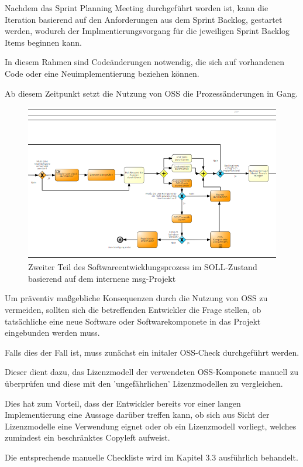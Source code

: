 Nachdem das Sprint Planning Meeting durchgeführt worden ist, kann die Iteration basierend auf den Anforderungen aus dem Sprint Backlog, gestartet werden, wodurch der Implmentierungsvorgang für die jeweiligen Sprint Backlog Items beginnen kann.

In diesem Rahmen sind Codeänderungen notwendig, die sich auf vorhandenen Code oder eine Neuimplementierung beziehen können.

Ab diesem Zeitpunkt setzt die Nutzung von OSS die Prozessänderungen in Gang.

\begin{figure}[h]
    \centering
    \includegraphics[scale=0.5]{Bilder/SOLL-Prozess_second Part.png}
    \caption{Zweiter Teil des Softwareentwicklungsprozess im SOLL-Zustand basierend auf dem internene msg-Projekt}
\end{figure}

Um präventiv maßgebliche Konsequenzen durch die Nutzung von OSS zu vermeiden, sollten sich die betreffenden Entwickler die Frage stellen, ob tatsächliche eine neue Software oder Softwarekomponete in das Projekt eingebunden werden muss. 

Falls dies der Fall ist, muss zunächst ein initaler OSS-Check durchgeführt werden. 

Dieser dient dazu, das Lizenzmodell der verwendeten OSS-Komponete manuell zu überprüfen und diese mit den 'ungefährlichen' Lizenzmodellen zu vergleichen. 

Dies hat zum Vorteil, dass der Entwickler bereits vor einer langen Implementierung eine Aussage darüber treffen kann, ob sich aus Sicht der Lizenzmodelle eine Verwendung eignet oder ob ein Lizenzmodell vorliegt, welches zumindest ein beschränktes Copyleft aufweist.

Die entsprechende manuelle Checkliste wird im Kapitel 3.3 ausführlich behandelt. 

